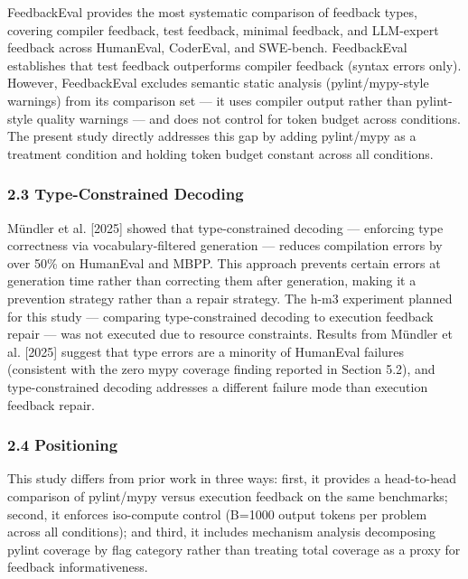 FeedbackEval \citep{Dai2025} provides the most systematic comparison of feedback types, covering compiler feedback, test feedback, minimal feedback, and LLM-expert feedback across HumanEval, CoderEval, and SWE-bench. FeedbackEval establishes that test feedback outperforms compiler feedback (syntax errors only). However, FeedbackEval excludes semantic static analysis (pylint/mypy-style warnings) from its comparison set --- it uses compiler output rather than pylint-style quality warnings --- and does not control for token budget across conditions. The present study directly addresses this gap by adding pylint/mypy as a treatment condition and holding token budget constant across all conditions.

\subsubsection{2.3 Type-Constrained Decoding}

Mündler et al. [2025] showed that type-constrained decoding --- enforcing type correctness via vocabulary-filtered generation --- reduces compilation errors by over 50\% on HumanEval and MBPP. This approach prevents certain errors at generation time rather than correcting them after generation, making it a prevention strategy rather than a repair strategy. The h-m3 experiment planned for this study --- comparing type-constrained decoding to execution feedback repair --- was not executed due to resource constraints. Results from Mündler et al. [2025] suggest that type errors are a minority of HumanEval failures (consistent with the zero mypy coverage finding reported in Section 5.2), and type-constrained decoding addresses a different failure mode than execution feedback repair.

\subsubsection{2.4 Positioning}

This study differs from prior work in three ways: first, it provides a head-to-head comparison of pylint/mypy versus execution feedback on the same benchmarks; second, it enforces iso-compute control (B=1000 output tokens per problem across all conditions); and third, it includes mechanism analysis decomposing pylint coverage by flag category rather than treating total coverage as a proxy for feedback informativeness.


